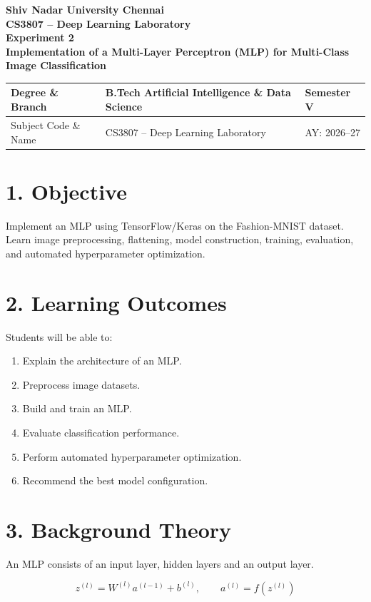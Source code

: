 \documentclass[11pt]{article}
\begin{document}
\begin{center}
{\Large\textbf{Shiv Nadar University Chennai}}\\
\textbf{CS3807 -- Deep Learning Laboratory}\\
\textbf{Experiment 2}\\
{\large\textbf{Implementation of a Multi-Layer Perceptron (MLP) for Multi-Class Image Classification}}
\end{center}

\renewcommand{\arraystretch}{1.25}

\begin{tabular}{|p{3.8cm}|p{8cm}|p{2cm}|}
\hline
Degree \& Branch & B.Tech Artificial Intelligence \& Data Science & Semester V\\ \hline
Subject Code \& Name & CS3807 -- Deep Learning Laboratory & AY: 2026--27\\ \hline
\end{tabular}

\section*{1. Objective}
Implement an MLP using TensorFlow/Keras on the Fashion-MNIST dataset. Learn image preprocessing, flattening, model construction, training, evaluation, and automated hyperparameter optimization.

\section*{2. Learning Outcomes}
Students will be able to:
\begin{enumerate}
\item Explain the architecture of an MLP.
\item Preprocess image datasets.
\item Build and train an MLP.
\item Evaluate classification performance.
\item Perform automated hyperparameter optimization.
\item Recommend the best model configuration.
\end{enumerate}

\section*{3. Background Theory}
An MLP consists of an input layer, hidden layers and an output layer.

\[
z^{(l)}=W^{(l)}a^{(l-1)}+b^{(l)},\qquad
a^{(l)}=f(z^{(l)})
\]
\end{document}
